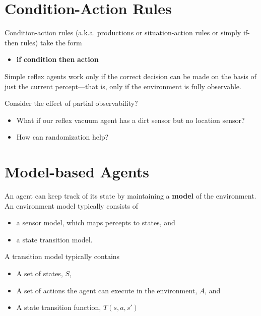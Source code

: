 \documentclass[11pt]{article}
\renewenvironment{quote}{\begin{shaded*}\begin{oldquote}}{\end{oldquote}\end{shaded*}}
\begin{document}
\section{Condition-Action Rules}
\label{sec:org32e9677}

Condition-action rules (a.k.a. productions or situation-action rules or simply if-then rules) take the form

\begin{itemize}
\item \textbf{if} \textbf{condition} \textbf{then} \textbf{action}
\end{itemize}

\begin{quote}
Simple reflex agents work only if the correct decision can be made on the basis of just the current percept—that is, only if the environment is fully observable.
\end{quote}

Consider the effect of partial observability?

\begin{itemize}
\item What if our reflex vacuum agent has a dirt sensor but no location sensor?
\item How can randomization help?
\end{itemize}
\section{Model-based Agents}
\label{sec:org4eb2a1c}


An agent can keep track of its state by maintaining a \textbf{model} of the environment.  An environment model typically consists of

\begin{itemize}
\item a sensor model, which maps percepts to states, and
\item a state transition model.
\end{itemize}

A transition model typically contains

\begin{itemize}
\item A set of states, \(S\),
\item A set of actions the agent can execute in the environment, \(A\), and
\item A state transition function, \(T(s, a, s')\)
\end{itemize}
\end{document}
